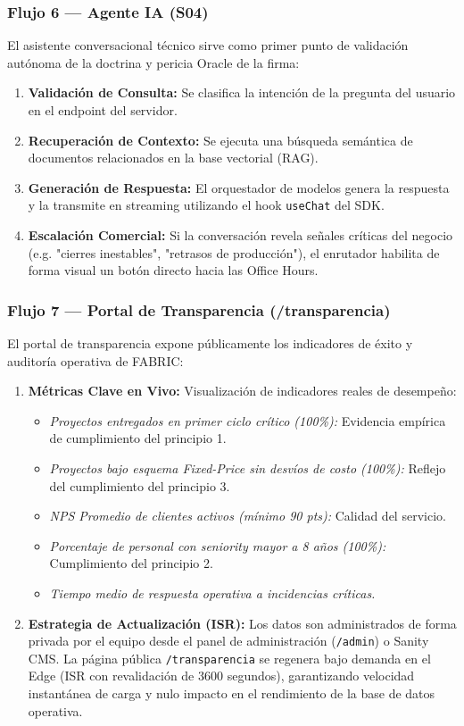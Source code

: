 \documentclass[11pt,letterpaper]{article}
\begin{document}
\subsubsection{Flujo 6 — Agente IA (S04)}
El asistente conversacional técnico sirve como primer punto de validación autónoma de la doctrina y pericia Oracle de la firma:
\begin{enumerate}
\item \textbf{Validación de Consulta:} Se clasifica la intención de la pregunta del usuario en el endpoint del servidor.
\item \textbf{Recuperación de Contexto:} Se ejecuta una búsqueda semántica de documentos relacionados en la base vectorial (RAG).
\item \textbf{Generación de Respuesta:} El orquestador de modelos genera la respuesta y la transmite en streaming utilizando el hook \texttt{useChat} del SDK.
\item \textbf{Escalación Comercial:} Si la conversación revela señales críticas del negocio (e.g. "cierres inestables", "retrasos de producción"), el enrutador habilita de forma visual un botón directo hacia las Office Hours.
\end{enumerate}

\subsubsection{Flujo 7 — Portal de Transparencia (/transparencia)}
El portal de transparencia expone públicamente los indicadores de éxito y auditoría operativa de FABRIC:
\begin{enumerate}
\item \textbf{Métricas Clave en Vivo:} Visualización de indicadores reales de desempeño:
  \begin{itemize}
  \item \emph{Proyectos entregados en primer ciclo crítico (100\%):} Evidencia empírica de cumplimiento del principio 1.
  \item \emph{Proyectos bajo esquema Fixed-Price sin desvíos de costo (100\%):} Reflejo del cumplimiento del principio 3.
  \item \emph{NPS Promedio de clientes activos (mínimo 90 pts):} Calidad del servicio.
  \item \emph{Porcentaje de personal con seniority mayor a 8 años (100\%):} Cumplimiento del principio 2.
  \item \emph{Tiempo medio de respuesta operativa a incidencias críticas.}
  \end{itemize}
\item \textbf{Estrategia de Actualización (ISR):} Los datos son administrados de forma privada por el equipo desde el panel de administración (\texttt{/admin}) o Sanity CMS. La página pública \texttt{/transparencia} se regenera bajo demanda en el Edge (ISR con revalidación de 3600 segundos), garantizando velocidad instantánea de carga y nulo impacto en el rendimiento de la base de datos operativa.
\end{enumerate}
\end{document}

